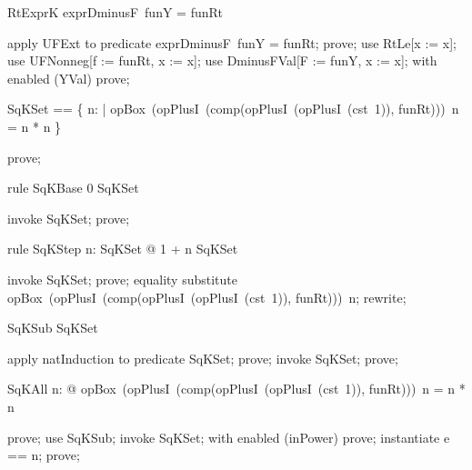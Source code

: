 \documentclass{article}
\begin{document}
\begin{theorem}{RtExprK}
  exprDminusF~funY = funRt
\end{theorem}

\begin{zproof}
apply UFExt to predicate exprDminusF~funY = funRt;
prove;
use RtLe[x := x];
use UFNonneg[f := funRt, x := x];
use DminusFVal[F := funY, x := x];
with enabled (YVal) prove;
\end{zproof}

\begin{zed}
  SqKSet == \{ n: \nat | opBox~(opPlusI~(comp(opPlusI~(opPlusI~(cst~1)), funRt)))~n = n * n \}
\end{zed}

\begin{zproof}
prove;
\end{zproof}

\begin{theorem}{rule SqKBase}
  0 \in SqKSet
\end{theorem}

\begin{zproof}
invoke SqKSet;
prove;
\end{zproof}

\begin{theorem}{rule SqKStep}
  \forall n: SqKSet @ 1 + n \in SqKSet
\end{theorem}

\begin{zproof}
invoke SqKSet;
prove;
equality substitute opBox~(opPlusI~(comp(opPlusI~(opPlusI~(cst~1)), funRt)))~n;
rewrite;
\end{zproof}

\begin{theorem}{SqKSub}
  \nat \subseteq SqKSet
\end{theorem}

\begin{zproof}
apply natInduction to predicate \nat \subseteq SqKSet;
prove;
invoke SqKSet;
prove;
\end{zproof}

\begin{theorem}{SqKAll}
  \forall n: \nat @ opBox~(opPlusI~(comp(opPlusI~(opPlusI~(cst~1)), funRt)))~n = n * n
\end{theorem}

\begin{zproof}
prove;
use SqKSub;
invoke SqKSet;
with enabled (inPower) prove;
instantiate e == n;
prove;
\end{zproof}
\end{document}
